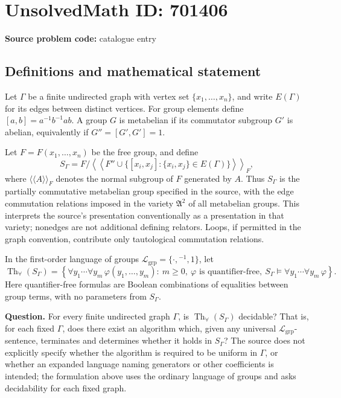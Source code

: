 \documentclass[11pt]{article}
\begin{document}
\section*{UnsolvedMath ID: 701406}
\textbf{Source problem code:} catalogue entry
\subsection{Definitions and mathematical statement}
Let \(\Gamma\) be a finite undirected graph with vertex set \(\{x_1,\ldots,x_n\}\), and write \(E(\Gamma)\) for its edges between distinct vertices. For group elements define \([a,b]=a^{-1}b^{-1}ab\). A group \(G\) is metabelian if its commutator subgroup \(G'\) is abelian, equivalently if \(G''=[G',G']=1\).

Let \(F=F(x_1,\ldots,x_n)\) be the free group, and define
\[
S_\Gamma=F\big/\left\langle\!\left\langle F''\cup\{[x_i,x_j]:\{x_i,x_j\}\in E(\Gamma)\}\right\rangle\!\right\rangle_F,
\]
where \(\langle\!\langle A\rangle\!\rangle_F\) denotes the normal subgroup of \(F\) generated by \(A\). Thus \(S_\Gamma\) is the partially commutative metabelian group specified in the source, with the edge commutation relations imposed in the variety \(\mathfrak A^2\) of all metabelian groups. This interprets the source's presentation conventionally as a presentation in that variety; nonedges are not additional defining relators. Loops, if permitted in the graph convention, contribute only tautological commutation relations.

In the first-order language of groups \(\mathcal L_{\mathrm{grp}}=\{\cdot,{}^{-1},1\}\), let
\[
\operatorname{Th}_{\forall}(S_\Gamma)=\left\{\forall y_1\cdots\forall y_m\,\varphi(y_1,\ldots,y_m):\ m\geq 0,\ \varphi\text{ is quantifier-free},\ S_\Gamma\models\forall y_1\cdots\forall y_m\,\varphi\right\}.
\]
Here quantifier-free formulas are Boolean combinations of equalities between group terms, with no parameters from \(S_\Gamma\).

\textbf{Question.} For every finite undirected graph \(\Gamma\), is \(\operatorname{Th}_{\forall}(S_\Gamma)\) decidable? That is, for each fixed \(\Gamma\), does there exist an algorithm which, given any universal \(\mathcal L_{\mathrm{grp}}\)-sentence, terminates and determines whether it holds in \(S_\Gamma\)? The source does not explicitly specify whether the algorithm is required to be uniform in \(\Gamma\), or whether an expanded language naming generators or other coefficients is intended; the formulation above uses the ordinary language of groups and asks decidability for each fixed graph.
\end{document}

